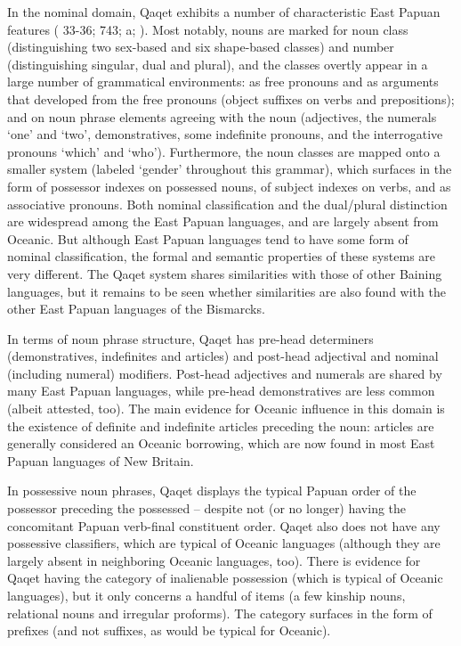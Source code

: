 \documentclass[a4paper, 11pt]{book}
\begin{document}
In the nominal domain, Qaqet exhibits a number of characteristic East Papuan features
(\citeauthor{dunn2002east} \citeyear{dunn2002east} 33-36; \citeauthor{dunn2008structural}
\citeyear{dunn2008structural} 743; \citeauthor{stebbins2009papuan} \citeyear{stebbins2009papuan}a;
\citeauthor{terrill2002systems} \citeyear{terrill2002systems}).
Most notably, nouns are marked for noun class (distinguishing two sex-based and six shape-based classes) and number (distinguishing singular, dual and plural), and the classes overtly appear in a large number of grammatical environments: as free pronouns and as arguments that developed from the free pronouns (object suffixes on verbs and prepositions); and on noun phrase elements agreeing with the noun (adjectives, the numerals ‘one’ and ‘two’, demonstratives, some indefinite pronouns, and the interrogative pronouns ‘which’ and ‘who’). Furthermore, the noun classes are mapped onto a smaller system (labeled ‘gender’ throughout this grammar), which surfaces in the form of possessor indexes on possessed nouns, of subject indexes on verbs, and as associative pronouns. Both nominal classification and the dual/plural distinction are widespread among the East Papuan languages, and are largely absent from Oceanic. But although East Papuan languages tend to have some form of nominal classification, the formal and semantic properties of these systems are very different. The Qaqet system shares similarities with those of other Baining languages, but it remains to be seen whether similarities are also found with the other East Papuan languages of the Bismarcks.

In terms of noun phrase structure, Qaqet has pre-head determiners (demonstratives, indefinites and articles) and post-head adjectival and nominal (including numeral) modifiers. Post-head adjectives and numerals are shared by many East Papuan languages, while pre-head demonstratives are less common (albeit attested, too). The main evidence for Oceanic influence in this domain is the existence of definite and indefinite articles preceding the noun: articles are generally considered an Oceanic borrowing, which are now found in most East Papuan languages of New Britain. 

In possessive noun phrases, Qaqet displays the typical Papuan order of the possessor preceding the possessed – despite not (or no longer) having the concomitant Papuan verb-final constituent order. Qaqet also does not have any possessive classifiers, which are typical of Oceanic languages (although they are largely absent in neighboring Oceanic languages, too). There is evidence for Qaqet having the category of inalienable possession (which is typical of Oceanic languages), but it only concerns a handful of items (a few kinship nouns, relational nouns and irregular proforms). The category surfaces in the form of prefixes (and not suffixes, as would be typical for Oceanic). 
\end{document}

